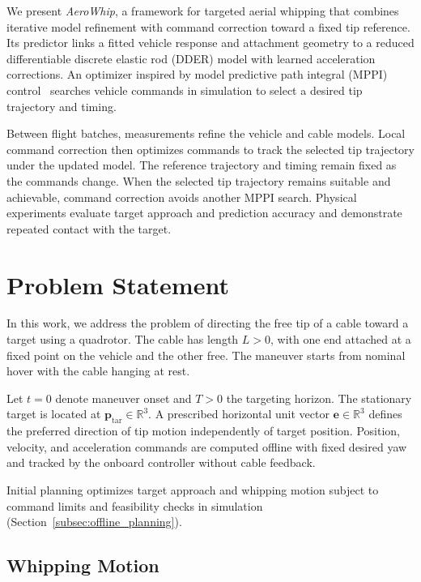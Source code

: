 \documentclass[letterpaper, 10 pt, conference]{ieeeconf}
\begin{document}
We present \emph{AeroWhip}, a framework for targeted aerial
whipping that combines iterative model refinement with command
correction toward a fixed tip reference. Its predictor links a
fitted vehicle response and attachment geometry to a reduced
differentiable discrete elastic rod (DDER) model with learned
acceleration corrections. An optimizer inspired by model
predictive path integral (MPPI)
control~\cite{williams2017model} searches vehicle commands in
simulation to select a desired tip trajectory and timing.

Between flight batches, measurements refine the vehicle and
cable models. Local command correction then optimizes commands
to track the selected tip trajectory under the updated model.
The reference trajectory and timing remain fixed as the commands
change. When the
selected tip trajectory remains suitable and achievable, command
correction avoids another MPPI search. Physical experiments
evaluate target approach and prediction accuracy and demonstrate
repeated contact with the target.

\section{Problem Statement}
\label{sec:problem_statement}

In this work, we address the problem of directing the free tip
of a cable toward a target using a quadrotor. The cable has
length $L>0$, with one end attached at a fixed point on the
vehicle and the other free. The maneuver starts from nominal
hover with the cable hanging at rest.

Let $t=0$ denote maneuver onset and $T>0$ the targeting horizon.
The stationary target is located at
$\mathbf p_{\mathrm{tar}}\in\mathbb R^3$. A prescribed horizontal
unit vector $\mathbf e\in\mathbb R^3$ defines the preferred
direction of tip motion independently of target position.
Position, velocity, and acceleration commands are computed
offline with fixed desired yaw and tracked by the onboard
controller without cable feedback.

Initial planning optimizes target approach and whipping motion
subject to command limits and feasibility checks in simulation
(Section~\ref{subsec:offline_planning}).

\subsection{Whipping Motion}
\label{subsec:whipping_motion}
\end{document}
